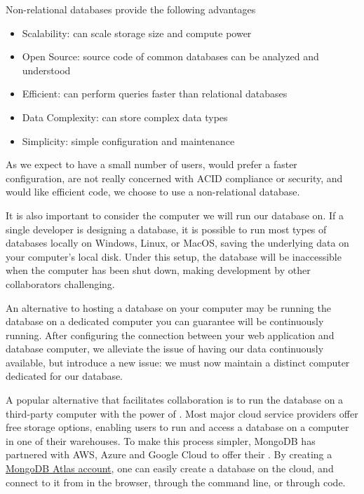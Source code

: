 Non-relational databases provide the following advantages

\begin{itemize}
    \item Scalability: can scale storage size and compute power
    \item Open Source: source code of common databases can be analyzed and understood
    \item Efficient: can perform queries faster than relational databases
    \item Data Complexity: can store complex data types
    \item Simplicity: simple configuration and maintenance 
\end{itemize}

As we expect to have a small number of users, would prefer a faster configuration, are not really concerned with ACID compliance or security, and would like efficient code, we choose to use a non-relational database. 

It is also important to consider the computer we will run our database on. If a single developer is designing a database, it is possible to run most types of databases locally on Windows, Linux, or MacOS, saving the underlying data on your computer's local disk. Under this setup, the database will be inaccessible when the computer has been shut down, making development by other collaborators challenging. 

An alternative to hosting a database on your computer may be running the database on a dedicated computer you can guarantee will be continuously running. After configuring the connection between your web application and database computer, we alleviate the issue of having our data continuously available, but introduce a new issue: we must now maintain a distinct computer dedicated for our database.

A popular alternative that facilitates collaboration is to run the database on a third-party computer with the power of . Most major cloud service providers offer free storage options, enabling users to run and access a database on a computer in one of their warehouses. To make this process simpler, MongoDB has partnered with AWS, Azure and Google Cloud to offer their . By creating a \href{https://www.mongodb.com/cloud/atlas/register}{MongoDB Atlas account}, one can easily create a database on the cloud, and connect to it from in the browser, through the command line, or through code.


